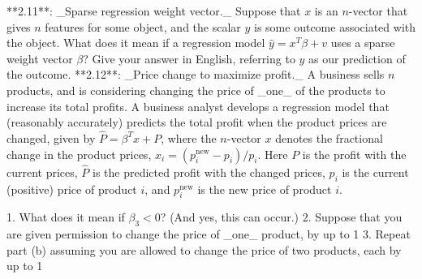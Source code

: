 

**2.11**: _Sparse regression weight vector._ Suppose that \(x\) is an \(n\)-vector that gives \(n\) features for some object, and the scalar \(y\) is some outcome associated with the object. What does it mean if a regression model \(\hat{y}=x^{T}\beta+v\) uses a sparse weight vector \(\beta\)? Give your answer in English, referring to \(\hat{y}\) as our prediction of the outcome.
**2.12**: _Price change to maximize profit._ A business sells \(n\) products, and is considering changing the price of _one_ of the products to increase its total profits. A business analyst develops a regression model that (reasonably accurately) predicts the total profit when the product prices are changed, given by \(\hat{P}=\beta^{T}x+P\), where the \(n\)-vector \(x\) denotes the fractional change in the product prices, \(x_{i}=(p_{i}^{\text{new}}-p_{i})/p_{i}\). Here \(P\) is the profit with the current prices, \(\hat{P}\) is the predicted profit with the changed prices, \(p_{i}\) is the current (positive) price of product \(i\), and \(p_{i}^{\text{new}}\) is the new price of product \(i\).

1. What does it mean if \(\beta_{3}<0\)? (And yes, this can occur.)
2. Suppose that you are given permission to change the price of _one_ product, by up to 1%
3. Repeat part (b) assuming you are allowed to change the price of two products, each by up to 1%

